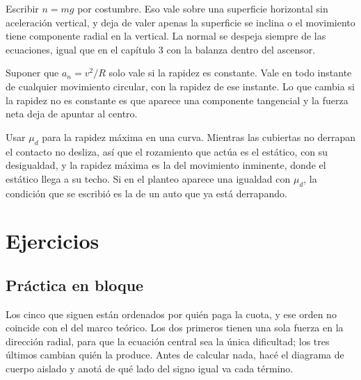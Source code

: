 \documentclass[11pt,openany]{book}
\begin{document}
\begin{erroresComunes}
  \item Escribir $n = mg$ por costumbre. Eso vale sobre una superficie horizontal sin aceleración vertical, y deja de valer apenas la superficie se inclina o el movimiento tiene componente radial en la vertical. La normal se despeja siempre de las ecuaciones, igual que en el capítulo 3 con la balanza dentro del ascensor.
  \item Suponer que $a_n = v^2/R$ solo vale si la rapidez es constante. Vale en todo instante de cualquier movimiento circular, con la rapidez de ese instante. Lo que cambia si la rapidez no es constante es que aparece una componente tangencial y la fuerza neta deja de apuntar al centro.
  \item Usar $\mu_d$ para la rapidez máxima en una curva. Mientras las cubiertas no derrapan el contacto no desliza, así que el rozamiento que actúa es el estático, con su desigualdad, y la rapidez máxima es la del movimiento inminente, donde el estático llega a su techo. Si en el planteo aparece una igualdad con $\mu_d$, la condición que se escribió es la de un auto que ya está derrapando.
\end{erroresComunes}

\section{Ejercicios}

\subsection{Práctica en bloque}

Los cinco que siguen están ordenados por quién paga la cuota, y ese orden no coincide con el del marco teórico. Los dos primeros tienen una sola fuerza en la dirección radial, para que la ecuación central sea la única dificultad; los tres últimos cambian quién la produce. Antes de calcular nada, hacé el diagrama de cuerpo aislado y anotá de qué lado del signo igual va cada término.
\end{document}
